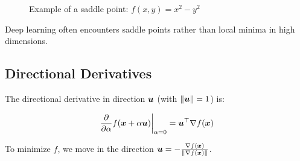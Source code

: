 \begin{figure}[h]
\centering
{}
\caption{Example of a saddle point: $f(x,y) = x^2 - y^2$}
\label{fig:saddle-point}
\end{figure}

Deep learning often encounters saddle points rather than local minima in high dimensions.

\subsection{Directional Derivatives}

The directional derivative in direction $\boldsymbol{u}$ (with $\|\boldsymbol{u}\| = 1$) is:

\begin{equation}
\frac{\partial}{\partial \alpha} f(\boldsymbol{x} + \alpha \boldsymbol{u}) \bigg|_{\alpha=0} = \boldsymbol{u}^\top \nabla f(\boldsymbol{x})
\end{equation}

To minimize $f$, we move in the direction $\boldsymbol{u} = -\frac{\nabla f(\boldsymbol{x})}{\|\nabla f(\boldsymbol{x})\|}$.
